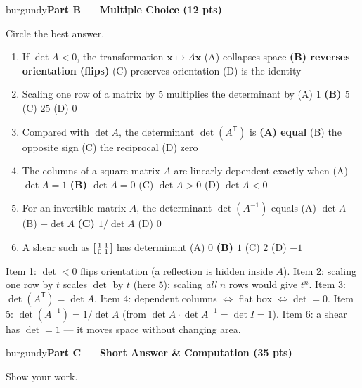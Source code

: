 \documentclass[10pt]{article}
\newcommand{\xx}{\mathbf{x}}
\newcommand{\T}{^{\mathsf T}}
\newcommand{\parthead}[1]{%
  \vspace{6pt}\noindent
  \begin{headlinebox}{burgundy}{\color{white}\bfseries #1}\end{headlinebox}%
  \vspace{4pt}}
\begin{document}
\parthead{Part B --- Multiple Choice (12 pts)}
Circle the best answer.

\begin{enumerate}[leftmargin=1.9em, itemsep=9pt]
  \item If $\det A<0$, the transformation $\xx\mapsto A\xx$
    \hfill (A) collapses space \quad \textbf{(B) reverses orientation (flips)} \ans{$\leftarrow$} \quad (C) preserves orientation \quad (D) is the identity
  \item Scaling one row of a matrix by $5$ multiplies the determinant by
    \hfill (A) $1$ \quad \textbf{(B) $5$} \ans{$\leftarrow$} \quad (C) $25$ \quad (D) $0$
  \item Compared with $\det A$, the determinant $\det(A\T)$ is
    \hfill \textbf{(A) equal} \ans{$\leftarrow$} \quad (B) the opposite sign \quad (C) the reciprocal \quad (D) zero
  \item The columns of a square matrix $A$ are linearly dependent exactly when
    \hfill (A) $\det A=1$ \quad \textbf{(B) $\det A=0$} \ans{$\leftarrow$} \quad (C) $\det A>0$ \quad (D) $\det A<0$
  \item For an invertible matrix $A$, the determinant $\det(A^{-1})$ equals
    \hfill (A) $\det A$ \quad (B) $-\det A$ \quad \textbf{(C) $1/\det A$} \ans{$\leftarrow$} \quad (D) $0$
  \item A shear such as $\begin{bsmallmatrix}1&1\\0&1\end{bsmallmatrix}$ has determinant
    \hfill (A) $0$ \quad \textbf{(B) $1$} \ans{$\leftarrow$} \quad (C) $2$ \quad (D) $-1$
\end{enumerate}

\begin{teachernote}
Item 1: $\det<0$ flips orientation (a reflection is hidden inside $A$). Item 2: scaling one row by $t$
scales $\det$ by $t$ (here $5$); scaling \emph{all} $n$ rows would give $t^n$. Item 3: $\det(A\T)=\det A$.
Item 4: dependent columns $\Leftrightarrow$ flat box $\Leftrightarrow\det=0$. Item 5:
$\det(A^{-1})=1/\det A$ (from $\det A\cdot\det A^{-1}=\det I=1$). Item 6: a shear has $\det=1$ --- it moves
space without changing area.
\end{teachernote}

\parthead{Part C --- Short Answer \& Computation (35 pts)}
Show your work.
\end{document}
